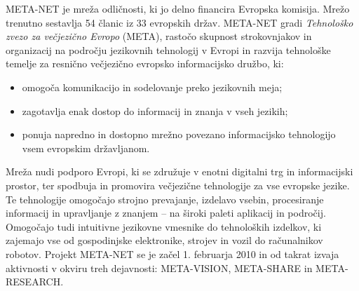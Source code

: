 \begin{multicols}{2}

META-NET je mreža odličnosti, ki jo delno financira Evropska komisija. Mrežo trenutno sestav\-lja 54 članic iz 33 evropskih držav\cite{rehm2011}. META-NET gradi \textit{Tehnološko zvezo za večjezično Evropo} (META), rastočo skupnost strokovnjakov in organizacij na področju jezikovnih tehnologij v Evropi in razvija tehnološke temelje za resnično večjezično evropsko informacij\-sko družbo, ki:

\begin{itemize}
	\item omogoča komunikacijo in sodelovanje preko jezikovnih meja;
	\item zagotav\-lja enak dostop do informacij in znanja v vseh jezikih;
	\item ponuja napredno in dostopno mrežno povezano informacij\-sko tehnologijo vsem evropskim držav\-ljanom.
\end{itemize}

Mreža nudi podporo Evropi, ki se združuje v enotni digitalni trg in informacij\-ski prostor, ter spodbuja in promovira večjezične tehnologije za vse evropske jezike. Te tehnologije omogočajo stroj\-no prevajanje, izdelavo vsebin, procesiranje informacij in uprav\-ljanje z znanjem – na široki paleti aplikacij in področij. Omogočajo tudi intuitivne jezikovne vmesnike do tehnoloških izdelkov, ki zajemajo vse od gospodinjske elektronike, strojev in vozil do računalnikov robotov. Projekt META-NET se je začel 1. februarja 2010 in od takrat izvaja aktivnosti v okviru treh dejavnosti: META-VISION, META-SHARE in META-RESEARCH.


\end{multicols}
